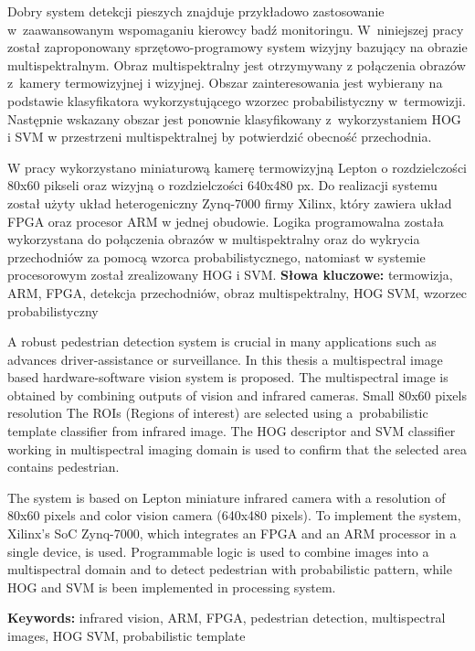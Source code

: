 \documentclass[12pt]{aghdpl}
\author{Tomasz Kańka}
\date{2018}
\newenvironment{abstractpage}
{\cleardoublepage\vspace*{\fill}\thispagestyle{empty} }
{\vfill\cleardoublepage}
\renewenvironment{abstract}[1]
{\bigskip\selectlanguage{#1}%
	\begin{center}\bfseries\abstractname\end{center}}
{\par\bigskip}
\begin{document}
\titlepages

\begin{abstractpage}
	\begin{abstract}{polish}
Dobry system detekcji pieszych znajduje przykładowo zastosowanie w~zaawansowanym wspomaganiu kierowcy badź monitoringu. 
W~niniejszej pracy został zaproponowany sprzętowo-programowy system wizyjny bazujący na obrazie multispektralnym. 
Obraz multispektralny jest otrzymywany z połączenia obrazów z~kamery termowizyjnej i wizyjnej.   
Obszar zainteresowania jest wybierany na podstawie klasyfikatora wykorzystującego wzorzec probabilistyczny w~termowizji.  
Następnie wskazany obszar jest ponownie klasyfikowany z~wykorzystaniem HOG i SVM w przestrzeni multispektralnej by potwierdzić obecność przechodnia. 

W pracy wykorzystano miniaturową kamerę termowizyjną Lepton o rozdzielczości 80x60 pikseli oraz wizyjną o rozdzielczości 640x480 px. Do realizacji systemu został użyty układ heterogeniczny Zynq-7000 firmy Xilinx, który zawiera układ FPGA oraz procesor ARM w jednej obudowie. Logika programowalna została wykorzystana do połączenia obrazów w multispektralny oraz do wykrycia przechodniów za pomocą wzorca probabilistycznego, natomiast w systemie procesorowym został zrealizowany HOG i SVM.
		\textbf{Słowa kluczowe:} 
termowizja, ARM, FPGA, detekcja przechodniów, obraz multispektralny, HOG SVM, wzorzec probabilistyczny
		
	\end{abstract}
	
	\begin{abstract}{english}
A robust pedestrian detection system is crucial in many applications such as advances driver-assistance or surveillance. 
In this thesis a multispectral image based hardware-software vision system is proposed. 
The multispectral image is obtained by combining outputs of vision and infrared cameras. Small 80x60 pixels resolution 
The ROIs (Regions of interest) are selected using a~probabilistic template classifier from infrared image. 
The HOG descriptor and SVM classifier working in multispectral imaging domain is used to confirm that the selected area contains pedestrian.

The system is based on Lepton miniature infrared camera with a resolution of 80x60 pixels and color vision camera (640x480 pixels). To implement the system, Xilinx's SoC Zynq-7000, which integrates an FPGA and an ARM processor in a single device, is used. Programmable logic is used to combine images into a multispectral domain and to detect pedestrian with probabilistic pattern, while HOG and SVM  is been implemented in processing system.
		
		\textbf{Keywords:} 
infrared vision, ARM, FPGA, pedestrian detection, multispectral images, HOG SVM, probabilistic template	
	\end{abstract}
\end{abstractpage}
\end{document}
